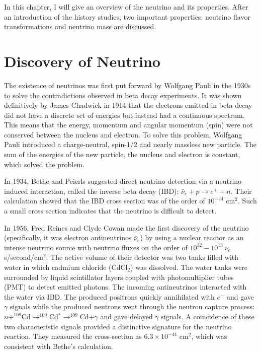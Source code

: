 
In this chapter, I will give an overview of the neutrino and its properties. After an introduction of the history studies, two important properties: neutrino flavor transformations and neutrino mass are discussed.

\section{Discovery of Neutrino}
The existence of neutrinos was first put forward by Wolfgang Pauli in the 1930s to solve the contradictions observed in beta decay experiments. It was shown definitively by James Chadwick in 1914 that the electrons emitted in beta decay did not have a discrete set of energies but instead had a continuous spectrum\cite{leite1996weak}. This means that the energy, momentum and angular momentum (spin) were not conserved between the nucleus and electron. To solve this problem, Wolfgang Pauli introduced a charge-neutral, spin-1/2 and nearly massless new particle. The sum of the energies of the new particle, the nucleus and electron is constant, which solved the problem. 

In 1934, Bethe and Peierls suggested direct neutrino detection via a neutrino-induced interaction, called the inverse beta decay (IBD): $\bar{\nu}_e+p\to e^+ + n$. Their calculation showed that the IBD cross section was of the order of $10^{-44}$ cm$^2$. Such a small cross section indicates that the neutrino is difficult to detect\cite{bethe1934neutrino}.

In 1956, Fred Reines and Clyde Cowan made the first discovery of the neutrino (specifically, it was electron antineutrinos $\bar{\nu}_e$) by using a nuclear reactor as an intense neutrino source with neutrino fluxes on the order of $10^{12}-10^{13}~\bar{\nu}_e$ s/second/cm$^2$. The active volume of their detector was two tanks filled with water in which cadmium chloride (CdCl$_2$) was dissolved. The water tanks were surrounded by liquid scintillator layers coupled with photomultiplier tubes (PMT) to detect emitted photons. The incoming antineutrinos interacted with the water via IBD. The produced positrons quickly annihilated with $e^-$ and gave $\gamma$ signals while the produced neutrons went through the neutron capture process: $n+^{108}$Cd$\to^{109}$Cd$^*\to^{109}$Cd$+\gamma$ and gave delayed $\gamma$ signals. A coincidence of these two characteristic signals provided a distinctive signature for the neutrino reaction. They measured the cross-section as $6.3\times10^{-44}$ cm$^2$, which was consistent with Bethe's calculation\cite{reines1960detection}.

